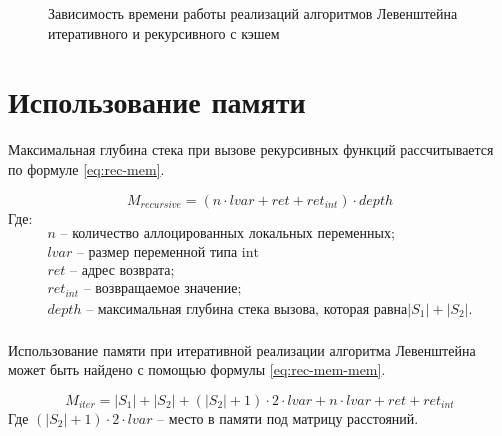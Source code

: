 \begin{figure}[h]
    \centering
    

    \caption{Зависимость времени работы реализаций алгоритмов Левенштейна итеративного и рекурсивного с кэшем}
    
    \label{fig:plot_iter_2}
\end{figure} 

\section{Использование памяти}

Максимальная глубина стека при вызове рекурсивных функций рассчитывается по формуле \eqref{eq:rec-mem}.

\begin{eqndesc}
\begin{equation}\label{eq:rec-mem}
	M_{recursive} = (n \cdot lvar + ret + ret_{int}) \cdot depth
\end{equation}
Где:
\[
\begin{array}{l}
	n\text{ -- количество аллоцированных локальных переменных}; \\
	lvar\text{ -- размер переменной типа int} \\
	ret \text{ -- адрес возврата;}\\
	ret_{int} \text{ -- возвращаемое значение;}\\
	depth\text{ --  максимальная глубина стека вызова, которая равна} |S_1| + |S_2| .\\
\end{array}
\]
\end{eqndesc}

Использование памяти при итеративной реализации алгоритма Левенштейна может быть найдено с помощью формулы \eqref{eq:rec-mem-mem}.
\begin{eqndesc}
    \begin{equation}
        \label{eq:rec-mem-mem}
        M_{iter} = |S_1| + |S_2| + (|S_2| + 1) \cdot 2 \cdot lvar + n \cdot lvar + ret + ret_{int}
    \end{equation}
    Где $(|S_2| + 1) \cdot 2 \cdot lvar$ -- место в памяти под матрицу расстояний.
\end{eqndesc}

